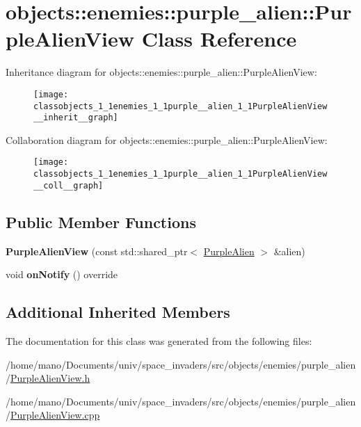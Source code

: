 \hypertarget{classobjects_1_1enemies_1_1purple__alien_1_1PurpleAlienView}{}\section{objects\+:\+:enemies\+:\+:purple\+\_\+alien\+:\+:Purple\+Alien\+View Class Reference}
\label{classobjects_1_1enemies_1_1purple__alien_1_1PurpleAlienView}


Inheritance diagram for objects\+:\+:enemies\+:\+:purple\+\_\+alien\+:\+:Purple\+Alien\+View\+:\nopagebreak
\begin{figure}[H]
\begin{center}
\leavevmode
\texttt{[image: classobjects\_1\_1enemies\_1\_1purple\_\_alien\_1\_1PurpleAlienView\_\_inherit\_\_graph]}
\end{center}
\end{figure}


Collaboration diagram for objects\+:\+:enemies\+:\+:purple\+\_\+alien\+:\+:Purple\+Alien\+View\+:\nopagebreak
\begin{figure}[H]
\begin{center}
\leavevmode
\texttt{[image: classobjects\_1\_1enemies\_1\_1purple\_\_alien\_1\_1PurpleAlienView\_\_coll\_\_graph]}
\end{center}
\end{figure}
\subsection*{Public Member Functions}
\begin{DoxyCompactItemize}
\item 
\mbox{\label{classobjects_1_1enemies_1_1purple__alien_1_1PurpleAlienView_acb437c721aa9ee586ac8ce427a966cef}}
{\bfseries Purple\+Alien\+View} (const std\+::shared\+\_\+ptr$<$ \hyperlink{classobjects_1_1enemies_1_1purple__alien_1_1PurpleAlien}{Purple\+Alien} $>$ \&alien)
\item 
\mbox{\label{classobjects_1_1enemies_1_1purple__alien_1_1PurpleAlienView_a1c0cd42fc59765b97724869601251590}}
void {\bfseries on\+Notify} () override
\end{DoxyCompactItemize}
\subsection*{Additional Inherited Members}


The documentation for this class was generated from the following files\+:\begin{DoxyCompactItemize}
\item 
/home/mano/\+Documents/univ/space\+\_\+invaders/src/objects/enemies/purple\+\_\+alien/\hyperlink{PurpleAlienView_8h}{Purple\+Alien\+View.\+h}\item
/home/mano/\+Documents/univ/space\+\_\+invaders/src/objects/enemies/purple\+\_\+alien/\hyperlink{PurpleAlienView_8cpp}{Purple\+Alien\+View.\+cpp}\end{DoxyCompactItemize}
